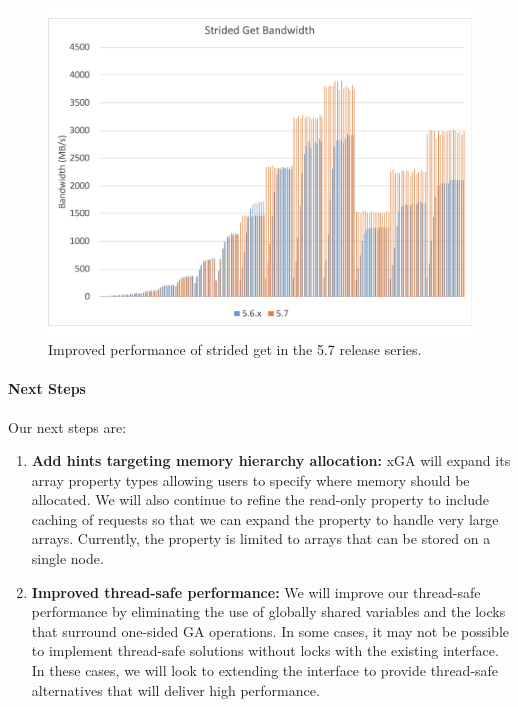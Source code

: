 \begin{figure}[htb]
    \centering
    \includegraphics[width=0.7\columnwidth]{projects/2.3.1-PMR/2.3.1.05-Global-Arrays/GA_get_bw}
    \caption{\label{fig:ga_bw}Improved performance of strided get in the 5.7 release series.}
\end{figure}

\paragraph{Next Steps}

Our next steps are:

\begin{enumerate}
\item \textbf{Add hints targeting memory hierarchy allocation:} xGA will
expand its array property types allowing users to specify where memory
should be allocated. We will also continue to refine the read-only property to
include caching of requests so that we can expand the property to handle very
large arrays. Currently, the property is limited to arrays that can be stored on
a single node.
\item \textbf{Improved thread-safe performance:} We will improve our
thread-safe performance by eliminating the use of globally shared variables and
the locks that surround one-sided GA operations. In some cases, it may not be
possible to implement thread-safe solutions without locks with the existing
interface. In these cases, we will look to extending the interface to provide
thread-safe alternatives that will deliver high performance.
\end{enumerate}
